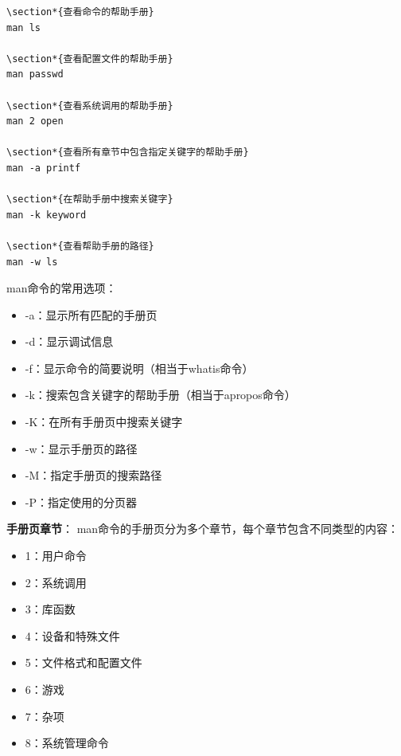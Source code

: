 \documentclass[12pt,UTF8]{ctexbook}
\begin{document}
\begin{verbatim}
\section*{查看命令的帮助手册}
man ls

\section*{查看配置文件的帮助手册}
man passwd

\section*{查看系统调用的帮助手册}
man 2 open

\section*{查看所有章节中包含指定关键字的帮助手册}
man -a printf

\section*{在帮助手册中搜索关键字}
man -k keyword

\section*{查看帮助手册的路径}
man -w ls
\end{verbatim}

man命令的常用选项：
\begin{itemize}
    \item -a：显示所有匹配的手册页
    \item -d：显示调试信息
    \item -f：显示命令的简要说明（相当于whatis命令）
    \item -k：搜索包含关键字的帮助手册（相当于apropos命令）
    \item -K：在所有手册页中搜索关键字
    \item -w：显示手册页的路径
    \item -M：指定手册页的搜索路径
    \item -P：指定使用的分页器
\end{itemize}

\textbf{手册页章节}：
man命令的手册页分为多个章节，每个章节包含不同类型的内容：
\begin{itemize}
    \item 1：用户命令
    \item 2：系统调用
    \item 3：库函数
    \item 4：设备和特殊文件
    \item 5：文件格式和配置文件
    \item 6：游戏
    \item 7：杂项
    \item 8：系统管理命令
\end{itemize}
\end{document}
